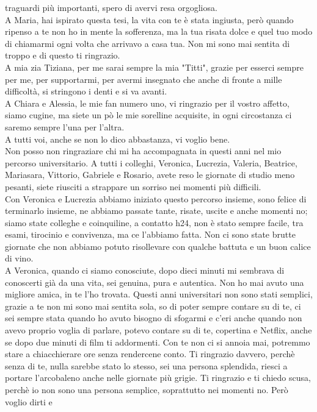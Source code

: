 traguardi più importanti, spero di avervi resa orgogliosa.\\
A Maria, hai ispirato questa tesi, la vita con te è stata ingiusta, però quando ripenso a te non ho in mente
la sofferenza, ma la tua risata dolce e quel tuo modo di chiamarmi ogni volta che arrivavo a casa tua. Non mi sono mai 
sentita di troppo e di questo ti ringrazio.\\
A mia zia Tiziana, per me sarai sempre la mia "Titti", grazie per esserci sempre per me, per supportarmi, per avermi
insegnato che anche di fronte a mille difficoltà, si stringono i denti e si va avanti.\\
A Chiara e Alessia, le mie fan numero uno, vi ringrazio per il vostro affetto, siamo cugine, ma siete un pò le mie 
sorelline acquisite, in ogni circostanza ci saremo sempre l’una per l’altra.\\
A tutti voi, anche se non lo dico abbastanza, vi voglio bene.\\
Non posso non ringraziare chi mi ha accompagnata in questi anni nel mio percorso universitario. A tutti i colleghi, 
Veronica, Lucrezia, Valeria, Beatrice, Mariasara, Vittorio, Gabriele e Rosario, avete reso le giornate di studio meno 
pesanti, siete riusciti a strappare un sorriso nei momenti più difficili.\\
Con Veronica e Lucrezia abbiamo iniziato questo percorso insieme, sono felice di terminarlo insieme, ne abbiamo passate 
tante, risate, uscite e anche momenti no; siamo state colleghe e coinquiline, a contatto h24, non è stato sempre facile, 
tra esami, tirocinio e convivenza, ma ce l’abbiamo fatta. Non ci sono state brutte giornate che non abbiamo 
potuto risollevare con qualche battuta e un buon calice di vino.\\
A Veronica, quando ci siamo conosciute, dopo dieci minuti mi sembrava di conoscerti già da 
una vita, sei genuina, pura e autentica. Non ho mai avuto una migliore amica, in te l’ho trovata. Questi anni universitari 
non sono stati semplici, grazie a te non mi sono mai sentita sola, so di poter sempre contare su di te, ci sei sempre 
stata quando ho avuto bisogno di sfogarmi e c’eri anche quando non avevo proprio voglia di parlare, potevo contare su 
di te, copertina e Netflix, anche se dopo due minuti di film ti addormenti. Con te non ci si annoia mai, potremmo stare 
a chiacchierare ore senza rendercene conto. Ti ringrazio davvero, perchè senza di te, nulla sarebbe stato lo stesso, 
sei una persona splendida, riesci a portare l’arcobaleno anche nelle giornate più grigie. 
Ti ringrazio e ti chiedo scusa, perchè io non sono una persona semplice, soprattutto nei momenti no. Però voglio dirti e 
